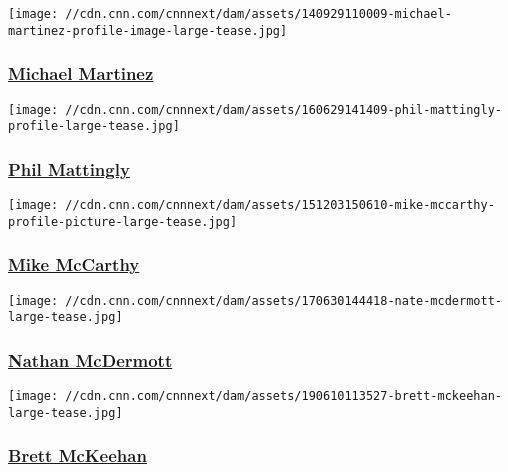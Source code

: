 \href{/profiles/michael-martinez}{}

\texttt{[image: //cdn.cnn.com/cnnnext/dam/assets/140929110009-michael-martinez-profile-image-large-tease.jpg]}

\hypertarget{michael-martinez}{%
\subsubsection{\texorpdfstring{\href{/profiles/michael-martinez}{Michael
Martinez}}{Michael Martinez}}\label{michael-martinez}}

\href{/profiles/phil-mattingliy-profile}{}

\texttt{[image: //cdn.cnn.com/cnnnext/dam/assets/160629141409-phil-mattingly-profile-large-tease.jpg]}

\hypertarget{phil-mattingly-}{%
\subsubsection{\texorpdfstring{\href{/profiles/phil-mattingliy-profile}{Phil
Mattingly }}{Phil Mattingly }}\label{phil-mattingly-}}

\href{/profiles/mike-mccarthy-profile}{}

\texttt{[image: //cdn.cnn.com/cnnnext/dam/assets/151203150610-mike-mccarthy-profile-picture-large-tease.jpg]}

\hypertarget{mike-mccarthy}{%
\subsubsection{\texorpdfstring{\href{/profiles/mike-mccarthy-profile}{Mike
McCarthy}}{Mike McCarthy}}\label{mike-mccarthy}}

\href{/profiles/nathan-mcdermott}{}

\texttt{[image: //cdn.cnn.com/cnnnext/dam/assets/170630144418-nate-mcdermott-large-tease.jpg]}

\hypertarget{nathan-mcdermott}{%
\subsubsection{\texorpdfstring{\href{/profiles/nathan-mcdermott}{Nathan
McDermott}}{Nathan McDermott}}\label{nathan-mcdermott}}

\href{/profiles/brett-mckeehan}{}

\texttt{[image: //cdn.cnn.com/cnnnext/dam/assets/190610113527-brett-mckeehan-large-tease.jpg]}

\hypertarget{brett-mckeehan}{%
\subsubsection{\texorpdfstring{\href{/profiles/brett-mckeehan}{Brett
McKeehan}}{Brett McKeehan}}\label{brett-mckeehan}}

